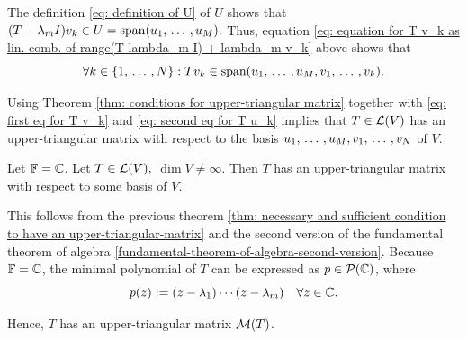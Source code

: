 \begin{prf}
  The definition \eqref{eq: definition of U} of $U$ shows that $(T-\lambda_mI) v_k \in U = \operatorname{span} (u_1, {\, \ldots \,\,}, u_M).$ Thus, equation \eqref{eq: equation for T v_k as lin. comb. of range(T-lambda_m I) + lambda_m v_k} above shows that
  \begin{equation}
    \label{eq: second eq for T u_k}
    \forall k \in \{ 1, {\, \ldots \,\,}, N \}: T v_k \in \operatorname{span} (u_1, {\, \ldots \,\,}, u_M, v_1, {\, \ldots \,\,}, v_k).
  \end{equation}

  Using Theorem \ref{thm: conditions for upper-triangular matrix} together with \eqref{eq: first eq for T v_k} and \eqref{eq: second eq for T u_k} implies that $T \in \mathcal{L}(V)$ has an upper-triangular matrix with respect to the basis $u_1, {\, \ldots \,\,}, u_M, v_1, {\, \ldots \,\,}, v_N$ of $V$.
\end{prf}


\setcounter{thm}{46}
\begin{thm}
  \label{thm: sufficienct condition about the field for every operator on V to have an upper-triangular matrix}
  Let $\mathbb{F} = \mathbb{C}$. Let $T\in \mathcal{L} (V),$ $\dim V \neq \infty$. Then $T$ has an upper-triangular matrix with respect to some basis of $V$.
\end{thm}
\begin{prf}
  This follows from the previous theorem \ref{thm: necessary and sufficient condition to have an upper-triangular-matrix} and the second version of the fundamental theorem of algebra \ref{fundamental-theorem-of-algebra-second-version}. Because $\mathbb{F} = \mathbb{C}$, the minimal polynomial of $T$ can be expressed as $p \in \mathcal{P}(\mathbb{C})$, where
  \begin{equation}
    p (z) := (z-\lambda_1) \cdots (z-\lambda_m) \quad \forall z \in \mathbb{C}.
  \end{equation}

  Hence, $T$ has an upper-triangular matrix $\mathcal{M}(T)$.
\end{prf}
